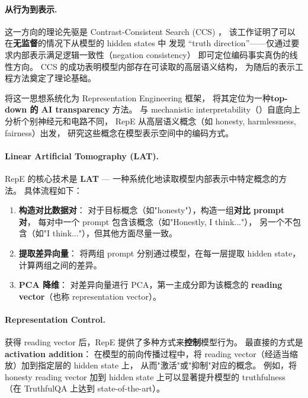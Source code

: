 \paragraph{从行为到表示.}
这一方向的理论先驱是 Contrast-Consistent Search (CCS) \citep{burns2022ccs}，
该工作证明了可以在\textbf{无监督}的情况下从模型的 hidden states 中
发现 ``truth direction''——仅通过要求内部表示满足逻辑一致性（negation consistency）
即可定位编码事实真伪的线性方向。
CCS 的成功表明模型内部存在可读取的高层语义结构，
为随后的表示工程方法奠定了理论基础。

 将这一思想系统化为 Representation Engineering 框架，
将其定位为一种\textbf{top-down 的 AI transparency} 方法。
与 mechanistic interpretability（）自底向上分析个别神经元和电路不同，
RepE 从高层语义概念（如 honesty, harmlessness, fairness）出发，
研究这些概念在模型表示空间中的编码方式。

\paragraph{Linear Artificial Tomography (LAT).}
RepE 的核心技术是 \textbf{LAT} ---
一种系统化地读取模型内部表示中特定概念的方法。
具体流程如下：

\begin{enumerate}[leftmargin=2em]
  \item \textbf{构造对比数据对}：
    对于目标概念（如"honesty"），构造一组\textbf{对比 prompt 对}，
    每对中一个 prompt 包含该概念（如"Honestly, I think..."），
    另一个不包含（如"I think..."），但其他方面尽量一致。

  \item \textbf{提取差异向量}：
    将两组 prompt 分别通过模型，在每一层提取 hidden state，
    计算两组之间的差异。

  \item \textbf{PCA 降维}：
    对差异向量进行 PCA，第一主成分即为该概念的
    \textbf{reading vector}（也称 representation vector）。
\end{enumerate}

\paragraph{Representation Control.}
获得 reading vector 后，RepE 提供了多种方式来\textbf{控制}模型行为。
最直接的方式是 \textbf{activation addition}：
在模型的前向传播过程中，将 reading vector（经适当缩放）加到指定层的 hidden state 上，
从而"激活"或"抑制"对应的概念。
例如，将 honesty reading vector 加到 hidden state 上可以显著提升模型的 truthfulness
（在 TruthfulQA 上达到 state-of-the-art）。

